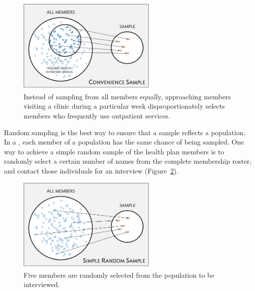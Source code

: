 
\begin{figure}[h!]
	\centering
	\includegraphics[width=0.60\textwidth]{ch_intro_to_data_oi_biostat/figures/sampleHealthPlan/sampleConvenienceHealthPlan.png}
	\caption{Instead of sampling from all members equally, approaching members visiting a clinic during a particular week disproportionately selects members who frequently use outpatient services.}
	\label{sampleConvenienceHealthPlan}
\end{figure}


Random sampling is the best way to ensure that a sample reflects a population. In a , each member of a population has the same chance of being sampled. One way to achieve a simple random sample of the health plan members is to randomly select a certain number of names from the complete membership roster, and contact those individuals for an interview (Figure~\ref{sampleRandomHealthPlan}). 

\begin{figure}[h!]
	\centering
	\includegraphics[width=0.60\textwidth]{ch_intro_to_data_oi_biostat/figures/sampleHealthPlan/sampleRandomHealthPlan.png}
	\caption{Five members are randomly selected from the population to be interviewed.}
	\label{sampleRandomHealthPlan}
\end{figure}

